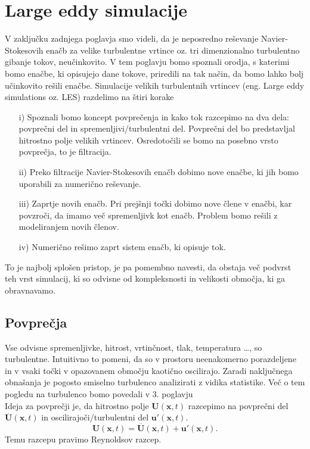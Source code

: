 \documentclass[mat2, tisk]{fmfdelo}
\newcommand{\bd}{\textbf}
\begin{document}
\newpage
\section{Large eddy simulacije}

V zaključku zadnjega poglavja smo videli, da je neposredno reševanje Navier-Stokesovih enačb 
za velike turbulentne vrtince oz. tri dimenzionalno turbulentno gibanje tokov, neučinkovito. V tem poglavju 
bomo spoznali orodja, s katerimi bomo enačbe, ki opisujejo dane tokove, priredili na tak
način, da bomo lahko bolj učinkovito rešili enačbe. Simulacije velikih turbulentnih vrtincev (eng. 
Large eddy simulations oz. LES) razdelimo na štiri korake 
\begin{enumerate}
\item[i)] Spoznali bomo koncept povprečenja in kako tok razcepimo na dva dela: 
povprečni del in spremenljivi/turbulentni del. Povprečni del bo predstavljal hitrostno polje 
velikih vrtincev. Osredotočili se bomo na posebno vrsto povprečja, to je filtracija.
\item[ii)] Preko filtracije Navier-Stokesovih enačb dobimo nove enačbe, ki jih bomo 
uporabili za numerično reševanje. 
\item[iii)] Zaprtje novih enačb. Pri prejšnji točki dobimo nove člene v enačbi, kar 
povzroči, da imamo več spremenljivk kot enačb. Problem bomo rešili z modeliranjem 
novih členov.
\item[iv)] Numerično rešimo zaprt sistem enačb, ki opisuje tok.
\end{enumerate}

To je najbolj splošen pristop, je pa pomembno navesti, da obstaja več podvrst teh vrst simulacij, 
ki so odvisne od kompleksnosti in velikosti območja, ki ga obravnavamo.

\subsection{Povprečja}

Vse odvisne spremenljivke, hitrost, vrtinčnost, tlak, temperatura \dots, so turbulentne.
Intuitivno to pomeni, da so v prostoru neenakomerno porazdeljene in v vsaki točki v 
opazovanem območju kaotično oscilirajo. Zaradi naključnega obnašanja je pogosto smiselno turbulenco 
analizirati z vidika statistike. Več o tem pogledu na turbulenco bomo povedali v $3$. poglavju \\
Ideja za povprečji je, da hitrostno polje $\bd{U}(\bd{x}, t)$ razcepimo na povprečni del $\overline{\bd{U}}(\bd{x}, t)$ in 
oscilirajoči/turbulentni del $\bd{u}'(\bd{x}, t)$.
\begin{equation}
\bd{U}(\bd{x}, t) = \overline{\bd{U}}(\bd{x},t) + \bd{u}'(\bd{x}, t).
\end{equation}
Temu razcepu pravimo Reynoldsov razcep.
\end{document}
